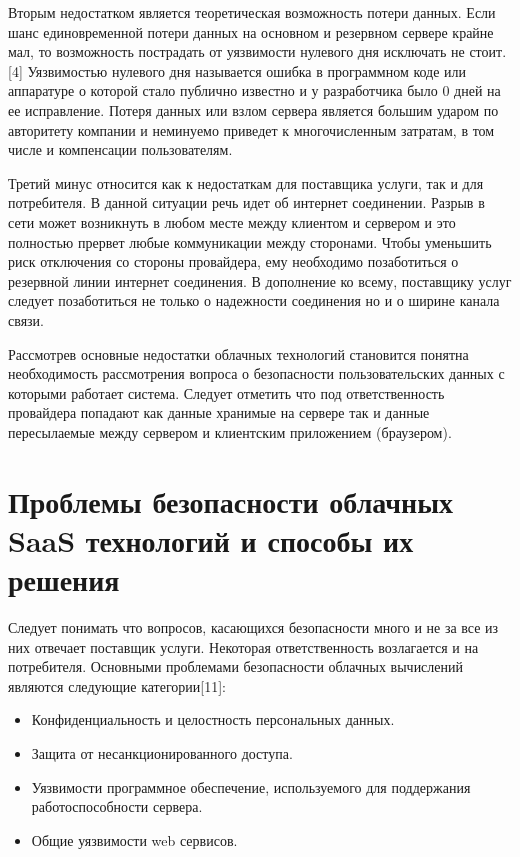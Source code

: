 Вторым недостатком является теоретическая возможность потери данных. Если шанс единовременной потери данных на основном и резервном сервере крайне мал, то возможность пострадать от уязвимости нулевого дня исключать не стоит.[4] Уязвимостью нулевого дня называется ошибка в программном коде или аппаратуре о которой стало публично известно и у разработчика было 0 дней на ее исправление. Потеря данных или взлом сервера является большим ударом по авторитету компании и неминуемо приведет к многочисленным затратам, в том числе и  компенсации пользователям.

Третий минус относится как к недостаткам для поставщика услуги, так и для потребителя. В данной ситуации речь идет об интернет соединении. Разрыв в сети может возникнуть в любом месте между клиентом и сервером и это полностью прервет любые коммуникации между сторонами. Чтобы уменьшить риск отключения со стороны провайдера, ему необходимо позаботиться о резервной линии интернет соединения. В дополнение ко всему, поставщику услуг следует позаботиться не только о надежности соединения но и о ширине канала связи.

Рассмотрев основные недостатки облачных технологий становится понятна необходимость рассмотрения вопроса о безопасности пользовательских данных с которыми работает система. Следует отметить что под ответственность провайдера попадают как данные хранимые на сервере так и данные пересылаемые между сервером и клиентским приложением (браузером).

\section{Проблемы безопасности облачных SaaS технологий и способы их решения}

Следует понимать что вопросов, касающихся безопасности много и не за все из них отвечает поставщик услуги. Некоторая ответственность возлагается и на потребителя.
Основными проблемами безопасности облачных вычислений являются следующие категории[11]:

\begin{itemize}
	\item Конфиденциальность и целостность персональных данных.
	\item Защита от несанкционированного доступа. 
	\item Уязвимости программное обеспечение, используемого для поддержания работоспособности сервера.
	\item Общие уязвимости web сервисов.
\end{itemize}

